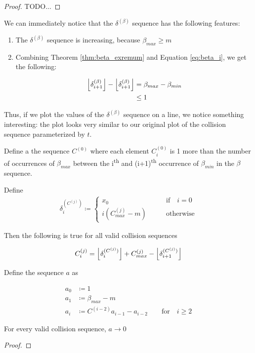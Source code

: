 \begin{proof}
	TODO...
\end{proof}

We can immediately notice that the $\delta^{(\beta)}$ sequence has the following features:

\begin{enumerate}
	\item The $\delta^{(\beta)}$ sequence is increasing, because $\beta_{max} \ge m$
	\item Combining Theorem \ref{thm:beta_exremum} and Equation \ref{eq:beta_i}, we get the following:

		\begin{align}
			\floor{\delta^{(\beta)}_{i+1}} - \floor{\delta^{(\beta)}_{i+1}}& = \beta_{max} - \beta_{min}\\
			& \le 1
		\end{align}
\end{enumerate}

Thus, if we plot the values of the $\delta^{(\beta)}$ sequence on a line, we notice something interesting: the plot looks very similar to our original plot of the collision sequence parameterized by $t$.

\begin{definition}
	Define a the sequence $C^{(0)}$ where each element $C^{(0)}_i$ is 1 more than the number of occurrences of $\beta_{max}$ between the i\textsuperscript{th} and (i+1)\textsuperscript{th} occurrence of $\beta_{min}$ in the $\beta$ sequence.
\end{definition} 

\begin{theorem}
	Define 
	\begin{align}\label{delta_c}
			\delta^{(C^{(j)})}_i \coloneqq \begin{cases}
				x_0 \qquad &\text{if} \quad i = 0\\
				i (C^{(j)}_{max} - m) \qquad &\text{otherwise}
			\end{cases}
	\end{align}

	Then the following is true for all valid collision sequences

	\begin{align}\label{eq:c_i}
		C^{(j)}_i = \floor{\delta^{(C^{(j)})}_i} + C^{(j)}_{max} - \floor{\delta^{(C^{(j)})}_{i+1}}
	\end{align}
\end{theorem} 

\begin{theorem}
	Define the sequence $a$ as

	\begin{align}
		a_0& \coloneqq 1\\
		a_1& \coloneqq \beta_{max} - m\\
		a_i& \coloneqq C^{(i-2)} a_{i-1} - a_{i-2} \qquad \text{for} \quad i \ge 2
	\end{align}

	For every valid collision sequence, $a \to 0$
\end{theorem}

\begin{proof}

\end{proof}